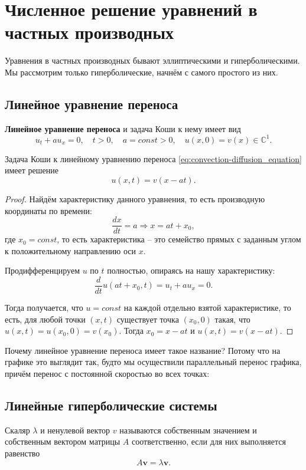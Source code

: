 \documentclass{article}
\begin{document}
\section{Численное решение уравнений в частных производных}

Уравнения в частных производных бывают эллиптическими и гиперболическими. Мы
рассмотрим только гиперболические, начнём с самого простого из них.

\subsection{Линейное уравнение переноса}
\begin{define}\label{eq:convection-diffusion_equation}
	\textbf{Линейное уравнение переноса} и задача Коши к нему имеет вид
	\[u_t+au_x=0,\quad t>0,\quad a=const>0,\quad u(x,0)=v(x)\in
	\mathbb C^1.\]
\end{define}

\begin{lemma}\label{eq:CDE_solution}
	Задача Коши к линейному уравнению переноса
	\eqref{eq:convection-diffusion_equation} имеет решение
	\[\boxed{u(x,t)=v(x-at)}.\]
\end{lemma}

\begin{proof}
	Найдём характеристику данного уравнения, то есть производную
	координаты по времени:
	\[\frac{dx}{dt}=a\Rightarrow x=at+x_0,\]
	где $x_0=const$, то есть характеристика -- это семейство прямых с
	заданным углом к положительному направлению оси $x$.

	Продифференцируем $u$ по $t$ полностью, опираясь на нашу характеристику:
	\[\frac{d}{dt}u(at+x_0,t)=u_t+au_x=0.\]

	Тогда получается, что $u=const$ на каждой отдельно взятой
	характеристике, то есть, для любой точки $(x,t)$ существует точка
	$(x_0,0)$ такая, что $u(x,t)=u(x_0,0)=v(x_0)$. Тогда $x_0=x-at$ и
	$u(x,t)=v(x-at)$.
\end{proof}

Почему линейное уравнение переноса имеет такое название? Потому что на графике
это выглядит так, будто мы осуществили параллельный перенос графика, причём
перенос с постоянной скоростью во всех точках: \\



\subsection{Линейные гиперболические системы}
\begin{define}
	Скаляр $\lambda$ и ненулевой вектор $v$ называются собственным
	значением и собственным вектором матрицы $A$ соответственно, если для
	них выполняется равенство
	\[A\boldsymbol v=\lambda \boldsymbol v.\]
\end{define}
\end{document}
